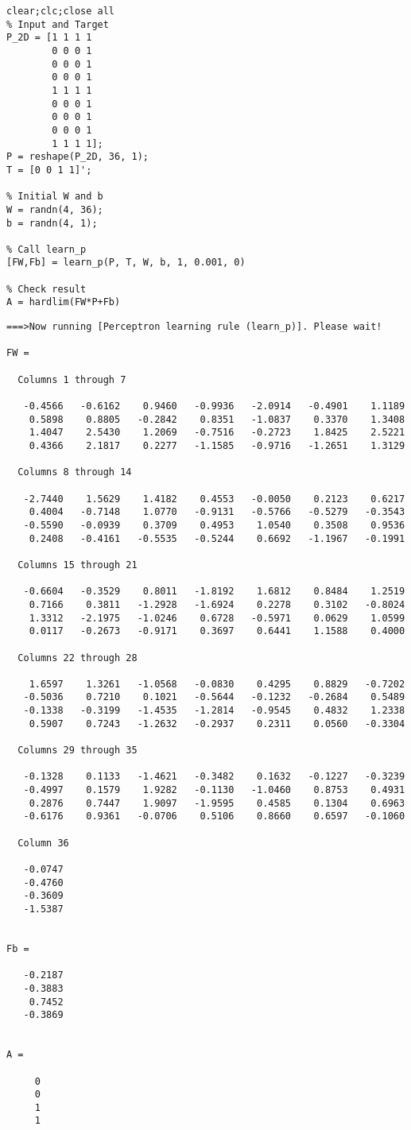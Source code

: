 \documentclass[12pt]{article}
\begin{document}

\begin{verbatim}
clear;clc;close all
% Input and Target
P_2D = [1 1 1 1
        0 0 0 1
        0 0 0 1
        0 0 0 1
        1 1 1 1
        0 0 0 1
        0 0 0 1
        0 0 0 1
        1 1 1 1];
P = reshape(P_2D, 36, 1);
T = [0 0 1 1]';

% Initial W and b
W = randn(4, 36);
b = randn(4, 1);

% Call learn_p
[FW,Fb] = learn_p(P, T, W, b, 1, 0.001, 0)

% Check result
A = hardlim(FW*P+Fb)
\end{verbatim}

        \color{lightgray} \begin{verbatim}
===>Now running [Perceptron learning rule (learn_p)]. Please wait!

FW =

  Columns 1 through 7

   -0.4566   -0.6162    0.9460   -0.9936   -2.0914   -0.4901    1.1189
    0.5898    0.8805   -0.2842    0.8351   -1.0837    0.3370    1.3408
    1.4047    2.5430    1.2069   -0.7516   -0.2723    1.8425    2.5221
    0.4366    2.1817    0.2277   -1.1585   -0.9716   -1.2651    1.3129

  Columns 8 through 14

   -2.7440    1.5629    1.4182    0.4553   -0.0050    0.2123    0.6217
    0.4004   -0.7148    1.0770   -0.9131   -0.5766   -0.5279   -0.3543
   -0.5590   -0.0939    0.3709    0.4953    1.0540    0.3508    0.9536
    0.2408   -0.4161   -0.5535   -0.5244    0.6692   -1.1967   -0.1991

  Columns 15 through 21

   -0.6604   -0.3529    0.8011   -1.8192    1.6812    0.8484    1.2519
    0.7166    0.3811   -1.2928   -1.6924    0.2278    0.3102   -0.8024
    1.3312   -2.1975   -1.0246    0.6728   -0.5971    0.0629    1.0599
    0.0117   -0.2673   -0.9171    0.3697    0.6441    1.1588    0.4000

  Columns 22 through 28

    1.6597    1.3261   -1.0568   -0.0830    0.4295    0.8829   -0.7202
   -0.5036    0.7210    0.1021   -0.5644   -0.1232   -0.2684    0.5489
   -0.1338   -0.3199   -1.4535   -1.2814   -0.9545    0.4832    1.2338
    0.5907    0.7243   -1.2632   -0.2937    0.2311    0.0560   -0.3304

  Columns 29 through 35

   -0.1328    0.1133   -1.4621   -0.3482    0.1632   -0.1227   -0.3239
   -0.4997    0.1579    1.9282   -0.1130   -1.0460    0.8753    0.4931
    0.2876    0.7447    1.9097   -1.9595    0.4585    0.1304    0.6963
   -0.6176    0.9361   -0.0706    0.5106    0.8660    0.6597   -0.1060

  Column 36

   -0.0747
   -0.4760
   -0.3609
   -1.5387


Fb =

   -0.2187
   -0.3883
    0.7452
   -0.3869


A =

     0
     0
     1
     1

\end{verbatim} \color{black}
\end{document}

